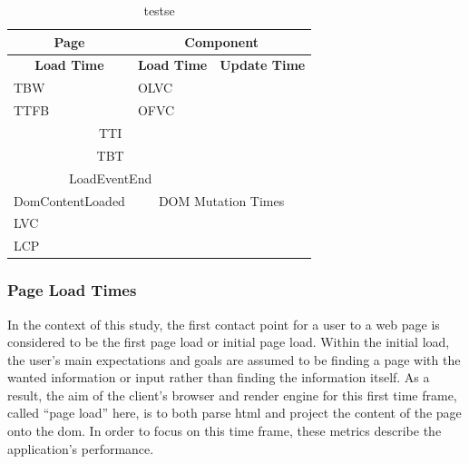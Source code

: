 \documentclass[a4paper, 12pt]{article}
\begin{document}
\begin{table}[h]
  \begin{center}
    \begin{tabular}[h]{|l|l|l|}
      \hline
      \multicolumn{1}{|c|}{\textbf{Page}}       & \multicolumn{2}{c|}{\textbf{Component}}     \\ \hline
      \multicolumn{1}{|c|}{\textbf{Load Time}}  & \textbf{Load Time}  & \textbf{Update Time}  \\ \hline
      TBW                                       & OLVC                &                       \\ \hline
      TTFB                                      & OFVC                &                       \\ \hline
      \multicolumn{2}{|c|}{TTI}                                       &                       \\ \hline
      \multicolumn{2}{|c|}{TBT}                                       &                       \\ \hline
      \multicolumn{2}{|c|}{LoadEventEnd}                              &                       \\ \hline
      DomContentLoaded                          & \multicolumn{2}{c|}{DOM Mutation Times}     \\ \hline
      LVC                                       &                               &             \\ \hline
      LCP                                       &                               &             \\ \hline
    \end{tabular}
  \end{center}
  \caption{testse}
\end{table}

\subsubsection{Page Load Times}\label{subsubsec:pageloadtimes}

In the context of this study, the first contact point for a user to a web page is considered to be the first page load or initial page load.
Within the initial load, the user's main expectations and goals are assumed to be finding a page with the wanted information or input rather than finding the information itself.
As a result, the aim of the client's browser and render engine for this first time frame, called \enquote{page load} here, is to both parse \acrshort{html} and project the content of the page onto the \acrshort{dom}.
In order to focus on this time frame, these metrics describe the application's performance.
\end{document}
